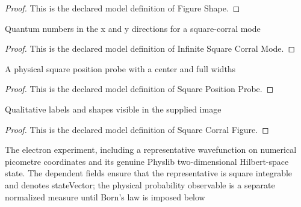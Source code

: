 \begin{proof}
  This is the declared model definition of Figure Shape.
\end{proof}
\begin{definition}
  \label{def:physics:phyx-mini-0583:phyxminiproblems-problemphyxmini0583-infinitesquarecorralmode}
  Quantum numbers in the x and y directions for a square-corral mode
\end{definition}
\begin{proof}
  This is the declared model definition of Infinite Square Corral Mode.
\end{proof}
\begin{definition}
  \label{def:physics:phyx-mini-0583:phyxminiproblems-problemphyxmini0583-squarepositionprobe}
  A physical square position probe with a center and full widths
\end{definition}
\begin{proof}
  This is the declared model definition of Square Position Probe.
\end{proof}
\begin{definition}
  \label{def:physics:phyx-mini-0583:phyxminiproblems-problemphyxmini0583-squarecorralfigure}
  Qualitative labels and shapes visible in the supplied image
\end{definition}
\begin{proof}
  This is the declared model definition of Square Corral Figure.
\end{proof}
\begin{definition}
  \label{def:physics:phyx-mini-0583:phyxminiproblems-problemphyxmini0583-squarecorralexperiment}
  The electron experiment, including a representative wavefunction on numerical picometre coordinates and its genuine Physlib two-dimensional Hilbert-space state. The dependent fields ensure that the representative is square integrable and denotes stateVector; the physical probability observable is a separate normalized measure until Born's law is imposed below
\end{definition}
